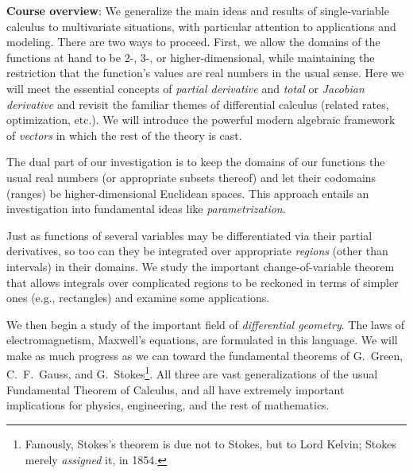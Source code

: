 \documentclass[12pt,twoside]{amsart}
\begin{document}
\textbf{Course overview}: We generalize the main ideas and results of single-variable calculus to multivariate situations, with particular attention to applications and modeling. There are two ways to proceed. First, we allow the domains of the functions at hand to be 2-, 3-, or higher-dimensional, while maintaining the restriction that the function's values are real numbers in the usual sense. Here we will meet the essential concepts of \emph{partial derivative} and \emph{total} or \emph{Jacobian derivative} and revisit the familiar themes of differential calculus (related rates, optimization, etc.). We will introduce the powerful modern algebraic framework of \emph{vectors} in which the rest of the theory is cast.

The dual part of our investigation is to keep the domains of our functions the usual real numbers (or appropriate subsets thereof) and let their codomains (ranges) be higher-dimensional Euclidean spaces. This approach entails an investigation into fundamental ideas like \emph{parametrization}.

Just as functions of several variables may be differentiated via their partial derivatives, so too can they be integrated over appropriate \emph{regions} (other than intervals) in their domains. We study the important change-of-variable theorem that allows integrals over complicated regions to be reckoned in terms of simpler ones (e.g., rectangles) and examine some applications. 

We then begin a study of the important field of \emph{differential geometry}. The laws of electromagnetism, Maxwell's equations, are formulated in this language. We will make as much progress as we can toward the fundamental theorems of G.\ Green, C.\ F.\ Gauss, and G.\ Stokes\footnote{Famously, Stokes's theorem is due not to Stokes, but to Lord Kelvin; Stokes merely \emph{assigned} it, in 1854.}. All three are vast generalizations of the usual Fundamental Theorem of Calculus, and all have extremely important implications for physics, engineering, and the rest of mathematics.
\end{document}
